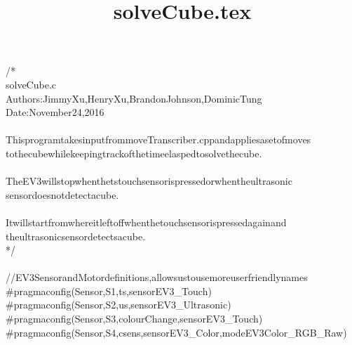 \documentclass[a4paper, 10pt]{article}
\title{solveCube.tex}
\newcommand\SPC{\hspace*{0.6em}}
\newcommand\HYP{\mbox{\char 45}}
\newcommand{\CppAComment}[1]{\textcolor[rgb]{0,0.5,0}{\colorbox[rgb]{1,1,1}{#1}}}
\newcommand{\CppAPreprocessor}[1]{\textcolor[rgb]{0,0.5,0}{\colorbox[rgb]{1,1,1}{#1}}}
\begin{document}
\begin{ttfamily}
\noindent
\CppAComment{/*}\\
\CppAComment{solveCube.c}\\
\CppAComment{Authors:\SPC Jimmy\SPC Xu,\SPC Henry\SPC Xu,\SPC Brandon\SPC Johnson,\SPC Dominic\SPC Tung}\\
\CppAComment{Date:\SPC November\SPC 24,\SPC 2016}\\
\\
\CppAComment{This\SPC program\SPC takes\SPC input\SPC from\SPC moveTranscriber.cpp\SPC and\SPC applies\SPC a\SPC set\SPC of\SPC moves}\\
\CppAComment{to\SPC the\SPC cube\SPC while\SPC keeping\SPC track\SPC of\SPC the\SPC time\SPC elasped\SPC to\SPC solve\SPC the\SPC cube.}\\
\\
\CppAComment{The\SPC EV3\SPC will\SPC stop\SPC when\SPC the\SPC ts\SPC touch\SPC sensor\SPC is\SPC pressed\SPC or\SPC when\SPC the\SPC ultrasonic}\\
\CppAComment{sensor\SPC does\SPC not\SPC detect\SPC a\SPC cube.}\\
\\
\CppAComment{It\SPC will\SPC start\SPC from\SPC where\SPC it\SPC left\SPC off\SPC when\SPC the\SPC touch\SPC sensor\SPC is\SPC pressed\SPC again\SPC and}\\
\CppAComment{the\SPC ultrasonic\SPC sensor\SPC detects\SPC a\SPC cube.}\\
\CppAComment{*/}\\
\\
\CppAComment{//EV3\SPC Sensor\SPC and\SPC Motor\SPC definitions,\SPC allows\SPC us\SPC to\SPC use\SPC more\SPC user\HYP friendly\SPC names}\\
\CppAPreprocessor{\#pragma\SPC config(Sensor,\SPC S1,\SPC \SPC \SPC \SPC \SPC ts,\SPC \SPC \SPC \SPC \SPC \SPC \SPC \SPC \SPC \SPC \SPC \SPC \SPC sensorEV3\_Touch)}\\
\CppAPreprocessor{\#pragma\SPC config(Sensor,\SPC S2,\SPC \SPC \SPC \SPC \SPC us,\SPC \SPC \SPC \SPC \SPC \SPC \SPC \SPC \SPC \SPC \SPC \SPC \SPC sensorEV3\_Ultrasonic)}\\
\CppAPreprocessor{\#pragma\SPC config(Sensor,\SPC S3,\SPC \SPC \SPC \SPC \SPC colourChange,\SPC \SPC \SPC sensorEV3\_Touch)}\\
\CppAPreprocessor{\#pragma\SPC config(Sensor,\SPC S4,\SPC \SPC \SPC \SPC \SPC csens,\SPC \SPC \SPC \SPC \SPC \SPC \SPC \SPC \SPC \SPC sensorEV3\_Color,\SPC modeEV3Color\_RGB\_Raw)}\\

\end{ttfamily}
\end{document}
